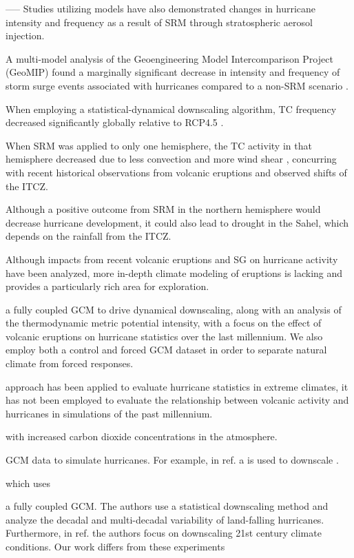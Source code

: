 ----- 
Studies utilizing models have also demonstrated changes in hurricane
intensity and frequency as a result of SRM through stratospheric
aerosol injection.


A multi-model analysis of the Geoengineering Model
Intercomparison Project (GeoMIP) found a marginally significant
decrease in intensity and frequency of storm surge events associated
with hurricanes compared to a non-SRM scenario \cite{atl_surge}.

When
employing a statistical-dynamical downscaling algorithm, TC frequency
decreased significantly globally relative to RCP4.5 \cite{solar_geo}.

When SRM was applied to only one hemisphere, the TC activity in that
hemisphere decreased due to less convection and more wind shear
\cite{solar_geo}, concurring with recent historical observations from
volcanic eruptions and observed shifts of the ITCZ.

Although a
positive outcome from SRM in the northern hemisphere would decrease
hurricane development, it could also lead to drought in the Sahel,
which depends on the rainfall from the ITCZ.

Although impacts from
recent volcanic eruptions and SG on hurricane activity have been
analyzed, more in-depth climate modeling of eruptions is lacking and
provides a particularly rich area for exploration.



a fully coupled GCM to drive dynamical
downscaling, along with an analysis of the thermodynamic metric
potential intensity, with a focus on the effect of volcanic eruptions
on hurricane statistics over the last millennium. We also employ both
a control and forced GCM dataset in order to separate natural climate
from forced responses.


 approach has been applied
to evaluate hurricane statistics in extreme climates, it has not been
employed to evaluate the relationship between volcanic activity and
hurricanes in simulations of the past millennium. 

with increased carbon dioxide
concentrations in the atmosphere.



GCM data to
simulate hurricanes. For example, in ref. \cite{} a
is used to
downscale .


which uses

a fully coupled GCM. The authors use a statistical downscaling method
and analyze the decadal and multi-decadal variability of land-falling
hurricanes. Furthermore, in ref. \cite{down_21st_gv}the authors focus
on downscaling 21st century climate conditions. Our work differs from
these experiments


